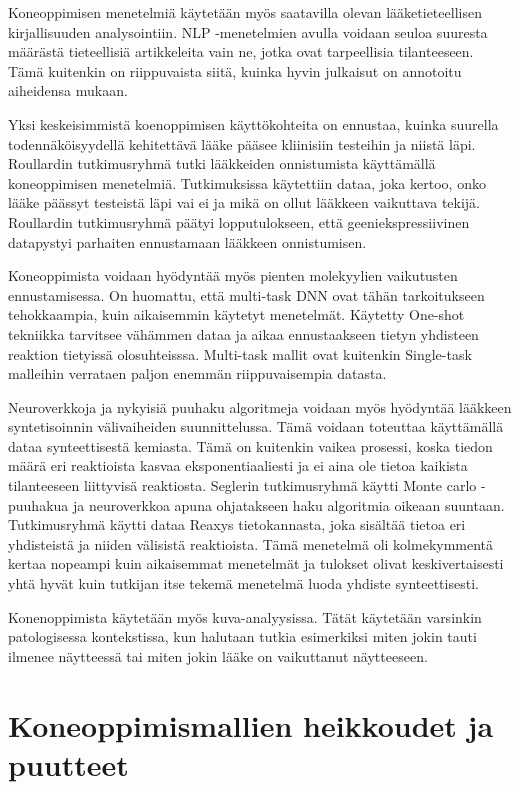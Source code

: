\documentclass[finnish,twoside,censored,essay,sw-line]{HYthesisML}
\begin{document}
Koneoppimisen menetelmiä käytetään myös saatavilla olevan lääketieteellisen kirjallisuuden analysointiin.
NLP -menetelmien avulla voidaan seuloa suuresta määrästä tieteellisiä artikkeleita vain ne, jotka ovat
tarpeellisia tilanteeseen. Tämä kuitenkin on riippuvaista siitä, kuinka hyvin julkaisut on annotoitu aiheidensa
mukaan.

Yksi keskeisimmistä koenoppimisen käyttökohteita on ennustaa, kuinka suurella todennäköisyydellä kehitettävä lääke
pääsee kliinisiin testeihin ja niistä läpi. Roullardin tutkimusryhmä tutki lääkkeiden onnistumista käyttämällä
koneoppimisen menetelmiä. Tutkimuksissa käytettiin dataa, joka kertoo, onko lääke päässyt testeistä läpi vai ei ja
mikä on ollut lääkkeen vaikuttava tekijä. Roullardin tutkimusryhmä päätyi lopputulokseen, että geeniekspressiivinen
datapystyi parhaiten ennustamaan lääkkeen onnistumisen.

Koneoppimista voidaan hyödyntää myös pienten molekyylien vaikutusten ennustamisessa. On huomattu, että
multi-task DNN ovat tähän tarkoitukseen tehokkaampia, kuin aikaisemmin käytetyt menetelmät. Käytetty
One-shot tekniikka tarvitsee vähämmen dataa ja aikaa ennustaakseen tietyn yhdisteen reaktion tietyissä
olosuhteisssa. Multi-task mallit ovat kuitenkin Single-task malleihin verrataen paljon enemmän riippuvaisempia
datasta.

Neuroverkkoja ja nykyisiä puuhaku algoritmeja voidaan myös hyödyntää lääkkeen syntetisoinnin välivaiheiden
suunnittelussa. Tämä voidaan toteuttaa käyttämällä dataa synteettisestä kemiasta. Tämä on kuitenkin vaikea
prosessi, koska tiedon määrä eri reaktioista kasvaa eksponentiaaliesti ja ei aina ole tietoa kaikista
tilanteeseen liittyvisä reaktiosta. Seglerin tutkimusryhmä käytti Monte carlo -puuhakua ja neuroverkkoa apuna
ohjatakseen haku algoritmia oikeaan suuntaan. Tutkimusryhmä käytti dataa Reaxys tietokannasta, joka sisältää
tietoa eri yhdisteistä ja niiden välisistä reaktioista. Tämä menetelmä oli kolmekymmentä kertaa nopeampi kuin
aikaisemmat menetelmät ja tulokset olivat keskivertaisesti yhtä hyvät kuin tutkijan itse tekemä menetelmä
luoda yhdiste synteettisesti.

Konenoppimista käytetään myös kuva-analyysissa. Tätät käytetään varsinkin patologisessa kontekstissa, kun
halutaan tutkia esimerkiksi miten jokin tauti ilmenee näytteessä tai miten jokin lääke on vaikuttanut näytteeseen.

\chapter{Koneoppimismallien heikkoudet ja puutteet}
\end{document}

